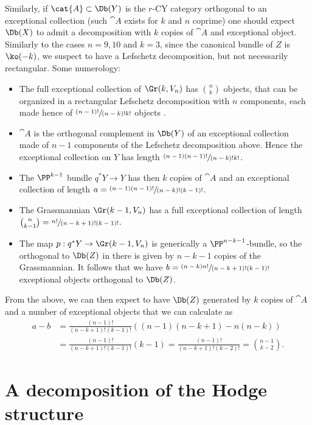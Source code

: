 Similarly, if $\cat{A} \subset \Db(Y)$ is the $r$-CY category orthogonal to an
exceptional collection (such $\cat{A}$ exists for $k$ and $n$ coprime) one should
expect $\Db(X)$ to admit a decomposition with $k$ copies of $\cat{A}$ and exceptional
object. Similarly to the cases $n=9,10$ and $k=3$, since the canonical bundle of $Z$
is $\ko(-k)$, we suspect to have a Lefschetz decomposition, but not necessarily
rectangular. Some numerology:

\begin{itemize}
\item The full exceptional collection of $\Gr(k,V_n)$ has $\binom{n}{k}$ objects,
that can be organized in a rectangular Lefschetz decomposition with $n$ components, each made
hence of $\sfrac{(n-1)!}{(n-k)!k!}$ objects \cite[Cor.\,4.4]{kuz-fractional}.
\item $\cat{A}$ is the orthogonal complement in $\Db(Y)$ of an exceptional collection
made of $n-1$ components of the Lefschetz decomposition above. Hence the exceptional collection
on $Y$ has length $\sfrac{(n-1)(n-1)!}{(n-k)!k!}$.
\item The $\PP^{k-1}$ bundle $q^*Y \to Y$ has then $k$ copies of $\cat{A}$ and an exceptional
collection of length $a=\sfrac{(n-1)(n-1)!}{(n-k)!(k-1)!}$.
\item The Grassmannian $\Gr(k-1,V_n)$ has a full exceptional collection of length
$\binom{n}{k-1}=\sfrac{n!}{(n-k+1)!(k-1)!}$.
\item The map $p:q^*Y \to \Gr(k-1,V_n)$ is generically a $\PP^{n-k-1}$-bundle, so
the orthogonal to $\Db(Z)$ in there is given by $n-k-1$ copies of the Grassmannian. It
follows that we have $b=\sfrac{(n-k)n!}{(n-k+1)!(k-1)!}$ exceptional objects orthogonal
to $\Db(Z)$.
\end{itemize}

From the above, we can then expect to have $\Db(Z)$ generated by $k$ copies of $\cat{A}$
and a number of exceptional objects that we can calculate as
\begin{align*}
a-b&=\frac{(n-1)!}{(n-k+1)!(k-1)!}((n-1)(n-k+1)-n(n-k))\\[-2pt]
&=\frac{(n-1)!}{(n-k+1)!(k-1)!}(k-1)= \frac{(n-1)!}{(n-k+1)!(k-2)!} = \binom{n-1}{k-2}.
\end{align*}
\appendix

\section{A decomposition of the Hodge structure}\label{sec:hodgedeco}

